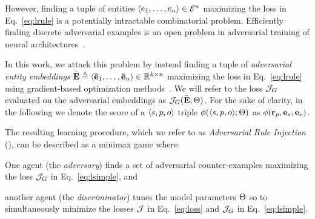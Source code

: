 %
However, finding a tuple of entities $\langle e_{1}, \ldots, e_{n} \rangle \in \mathcal{E}^{n}$ maximizing the loss in Eq.~\ref{eq:lrule} is a potentially intractable combinatorial problem.
%
Efficiently finding discrete adversarial examples is an open problem in adversarial training of neural architectures~\cite{1701.00160}.
%

%
In this work, we attack this problem by instead finding a tuple of \emph{adversarial entity embeddings} $\bar{\mathbf{E}} \triangleq \langle \mathbf{\bar{e}}_{1}, \ldots, \mathbf{\bar{e}}_{n} \rangle \in \mathbb{R}^{k \times n}$ maximizing the loss in Eq.~\ref{eq:lrule} using gradient-based optimization methods~\cite{Goodfellow-et-al-2016}.
%
We will refer to the loss $\mathcal{J}_{G}$ evaluated on the adversarial embeddings as $\mathcal{J}_{G}(\bar{\mathbf{E}} ; \Theta)$.
%
For the sake of clarity, in the following we denote the score of a $\langle s, p, o \rangle$ triple $\phi(\langle s, p, o \rangle ; \Theta)$ as $\phi(\mathbf{r}_{p}, \mathbf{e}_{s}, \mathbf{e}_{o})$.
%

%
The resulting learning procedure, which we refer to as \emph{Adversarial Rule Injection} (\ARI), can be described as a minimax game where:
%
\begin{inparaenum}[1)]
% 
 \item One agent (the \emph{adversary}) finds a set of adversarial counter-examples maximizing the loss $\mathcal{J}_{G}$ in Eq.~\ref{eq:lsimple}, and
%
 \item another agent (the \emph{discriminator}) tunes the model parameters $\Theta$ so to simultaneously minimize the losses $\mathcal{J}$ in Eq.~\ref{eq:loss} and $\mathcal{J}_{G}$ in Eq.~\ref{eq:lsimple}.
%
\end{inparaenum}
%

